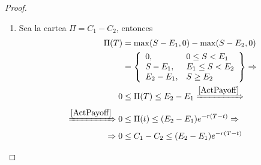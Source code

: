 \begin{proof}
\begin{enumerate}
        \item Sea la cartea $\Pi = C_1 - C_2$, entonces
        \begin{align*}
            \Pi(T) &= \max(S - E_1,0) - \max(S - E_2,0) \\
            &= \left\{
            \begin{array}{ll}
            0,       & 0 \leq S < E_1 \\
            S-E_1,   & E_1 \leq S < E_2 \\
            E_2-E_1, & S \geq E_2
            \end{array}
            \right\} \Rightarrow \\
            0 &\leq \Pi(T) \leq E_2-E_1 \xRightarrow{\ref{ActPayoff}}\\
            \xRightarrow{\ref{ActPayoff}} 0 &\leq \Pi(t) \leq (E_2-E_1)e^{-r(T-t)} \Rightarrow \\
            \Rightarrow 0 &\leq C_1 - C_2 \leq (E_2-E_1)e^{-r(T-t)}
        \end{align*}
    \end{enumerate}
\end{proof}




